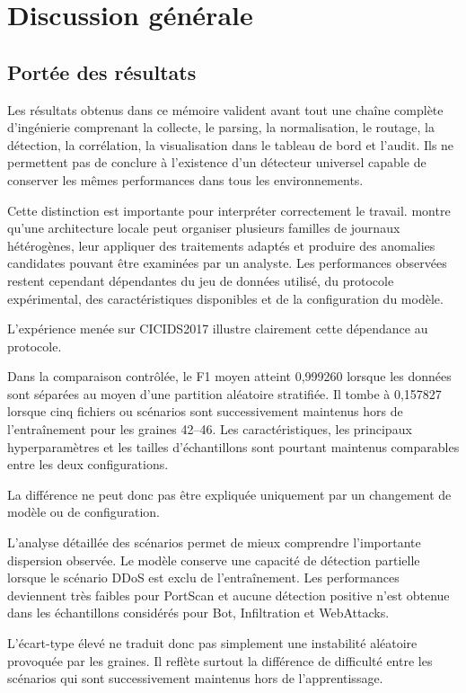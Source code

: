\chapter{Discussion générale}

\section{Portée des résultats}

Les résultats obtenus dans ce mémoire valident avant tout une chaîne complète d'ingénierie comprenant la collecte, le parsing, la normalisation, le routage, la détection, la corrélation, la visualisation dans le tableau de bord et l'audit. Ils ne permettent pas de conclure à l'existence d'un détecteur universel capable de conserver les mêmes performances dans tous les environnements.

Cette distinction est importante pour interpréter correctement le travail. \logminer{} montre qu'une architecture locale peut organiser plusieurs familles de journaux hétérogènes, leur appliquer des traitements adaptés et produire des anomalies candidates pouvant être examinées par un analyste. Les performances observées restent cependant dépendantes du jeu de données utilisé, du protocole expérimental, des caractéristiques disponibles et de la configuration du modèle.

L'expérience menée sur CICIDS2017 illustre clairement cette dépendance au protocole.

Dans la comparaison contrôlée, le F1 moyen atteint 0,999260 lorsque les données sont séparées au moyen d'une partition aléatoire stratifiée. Il tombe à 0,157827 lorsque cinq fichiers ou scénarios sont successivement maintenus hors de l'entraînement pour les graines 42--46. Les caractéristiques, les principaux hyperparamètres et les tailles d'échantillons sont pourtant maintenus comparables entre les deux configurations.

La différence ne peut donc pas être expliquée uniquement par un changement de modèle ou de configuration.

L'analyse détaillée des scénarios permet de mieux comprendre l'importante dispersion observée. Le modèle conserve une capacité de détection partielle lorsque le scénario DDoS est exclu de l'entraînement. Les performances deviennent très faibles pour PortScan et aucune détection positive n'est obtenue dans les échantillons considérés pour Bot, Infiltration et WebAttacks.

L'écart-type élevé ne traduit donc pas simplement une instabilité aléatoire provoquée par les graines. Il reflète surtout la différence de difficulté entre les scénarios qui sont successivement maintenus hors de l'apprentissage.

